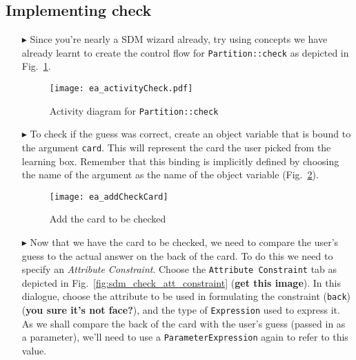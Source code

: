 \newpage
\subsection{Implementing check}
\visHeader
\hypertarget{checkCard vis}{}

\begin{itemize}

\item[$\blacktriangleright$] Since you're nearly a SDM wizard already, try using concepts we have already learnt to create the control flow for
\texttt{Partition::check} as depicted in Fig.~\ref{fig:sdm_check_start}.

\begin{figure}[htbp]
\begin{center}
  \texttt{[image: ea\_activityCheck.pdf]}
  \caption{Activity diagram for \texttt{Partition::check}}
  \label{fig:sdm_check_start}
\end{center}
\end{figure}

\item[$\blacktriangleright$] To check if the guess was correct, create an object variable that is bound to the argument \texttt{card}. This will
represent the card the user picked from the learning box. Remember that this binding is implicitly defined by choosing the name of the argument as the
name of the object variable (Fig.~\ref{fig:sdm_check_addCard}).

\begin{figure}[htbp]
\begin{center}
  \texttt{[image: ea\_addCheckCard]}
  \caption{Add the card to be checked}
  \label{fig:sdm_check_addCard}
\end{center}
\end{figure}

\item[$\blacktriangleright$] Now that we have the card to be checked, we need to compare the user's guess to the actual answer on the
back of the card. To do this we need to specify an \emph{Attribute Constraint}. Choose the \texttt{Attribute Constraint} tab as depicted in
Fig.~\ref{fig:sdm_check_att_constraint} ({\bf get this image}). In this dialogue, choose the attribute to be used in formulating the constraint
(\texttt{back})({\bf you sure it's not face?}), and the type of \texttt{Expression} used to express it. As we shall compare the back of the card with the user's
guess (passed in as a parameter), we'll need to use a \texttt{ParameterExpression} again to refer to this value.


\end{itemize}
